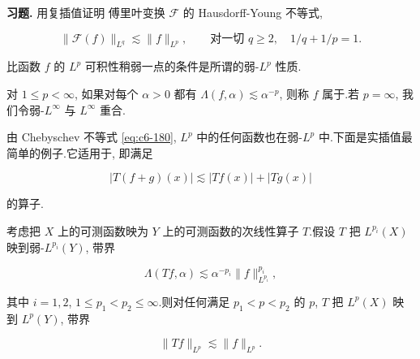 \textbf{习题.} 用复插值证明 傅里叶变换 $\mathcal{F}$ 的 Hausdorff-Young 不等式,

\[
\|\mathcal{F}(f)\|_{L^q} \lesssim \|f\|_{L^p}, \qquad \text{对一切 } q\ge 2, \quad 1/q + 1/p = 1.
\]


比函数 $f$ 的 $L^p$ 可积性稍弱一点的条件是所谓的弱-$L^p$ 性质.

\begin{definition}\label{def:c6-1.12}
对 $1\le p<\infty$, 如果对每个 $\alpha>0$ 都有 $\Lambda(f, \alpha)\lesssim\alpha^{-p}$, 则称 $f$ 属于.若 $p = \infty$, 我们令弱-$L^\infty$ 与 $L^\infty$ 重合.
\end{definition}

由 Chebyschev 不等式 \eqref{eq:c6-180}, $L^p$ 中的任何函数也在弱-$L^p$ 中.下面是实插值最简单的例子.它适用于, 即满足

\[
|T(f+g)(x)| \lesssim |Tf(x)| + |Tg(x)|
\]

的算子.

\begin{theorem}\label{thm:c6-1.13}
考虑把 $X$ 上的可测函数映为 $Y$ 上的可测函数的次线性算子 $T$.假设 $T$ 把 $L^{p_i}(X)$ 映到弱-$L^{p_i}(Y)$, 带界

\[
\Lambda(Tf, \alpha) \lesssim \alpha^{-p_i}\|f\|_{L^{p_i}}^{p_i},
\]

其中 $i = 1, 2$, $1\le p_1 < p_2\le\infty$.则对任何满足 $p_1 < p < p_2$ 的 $p$, $T$ 把 $L^p(X)$ 映到 $L^p(Y)$, 带界

\[
\|Tf\|_{L^p} \lesssim \|f\|_{L^p}.
\]
\end{theorem}

